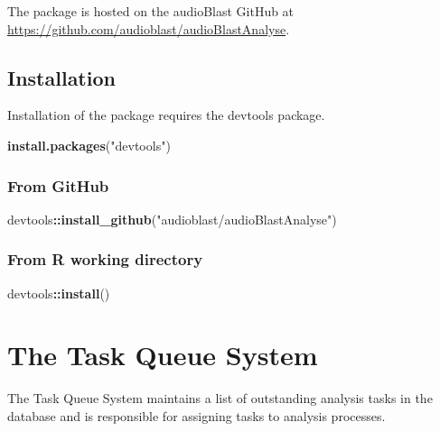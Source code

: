 \documentclass[
]{book}
\newenvironment{Shaded}{\begin{snugshade}}{\end{snugshade}}
\newcommand{\FunctionTok}[1]{\textcolor[rgb]{0.13,0.29,0.53}{\textbf{#1}}}
\newcommand{\NormalTok}[1]{#1}
\newcommand{\SpecialCharTok}[1]{\textcolor[rgb]{0.81,0.36,0.00}{\textbf{#1}}}
\newcommand{\StringTok}[1]{\textcolor[rgb]{0.31,0.60,0.02}{#1}}
\begin{document}
The package is hosted on the audioBlast GitHub at \url{https://github.com/audioblast/audioBlastAnalyse}.

\hypertarget{installation}{%
\section{Installation}\label{installation}}

Installation of the package requires the devtools package.

\begin{Shaded}
\begin{Highlighting}[]
\FunctionTok{install.packages}\NormalTok{(}\StringTok{"devtools"}\NormalTok{)}
\end{Highlighting}
\end{Shaded}

\hypertarget{from-github}{%
\subsection{From GitHub}\label{from-github}}

\begin{Shaded}
\begin{Highlighting}[]
\NormalTok{devtools}\SpecialCharTok{::}\FunctionTok{install\_github}\NormalTok{(}\StringTok{"audioblast/audioBlastAnalyse"}\NormalTok{)}
\end{Highlighting}
\end{Shaded}

\hypertarget{from-r-working-directory}{%
\subsection{From R working directory}\label{from-r-working-directory}}

\begin{Shaded}
\begin{Highlighting}[]
\NormalTok{devtools}\SpecialCharTok{::}\FunctionTok{install}\NormalTok{()}
\end{Highlighting}
\end{Shaded}

\hypertarget{the-task-queue-system}{%
\chapter{The Task Queue System}\label{the-task-queue-system}}

The Task Queue System maintains a list of outstanding analysis tasks in the database and is responsible for assigning tasks to analysis processes.
\end{document}
